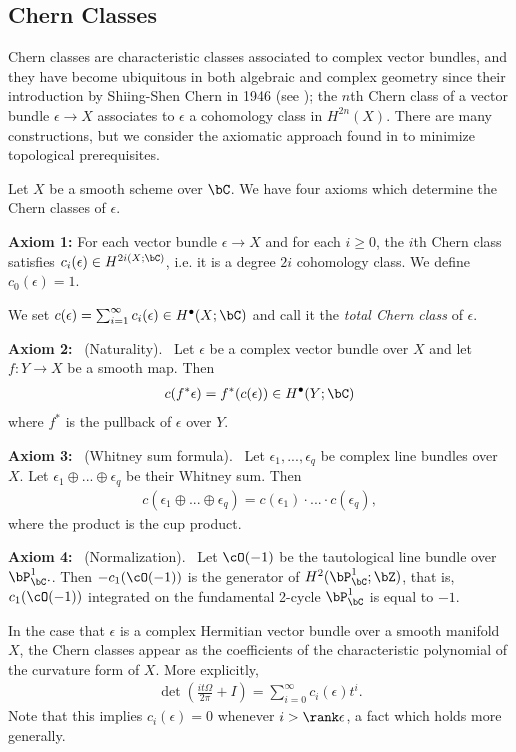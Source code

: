 \documentclass[raggedright, nofonts, notitlepage, openany, debug]{tufte-book}
\begin{document}
\subsection{Chern Classes}
Chern classes are characteristic classes associated to complex vector bundles, and they have become ubiquitous in both algebraic and complex geometry since their introduction by Shiing-Shen Chern in 1946 (see \cite{chern-class-first-paper}); the $n$th Chern class of a vector bundle $\epsilon \to X$ associates to $\epsilon$ a cohomology class in $H^{2n}(X)$. There are many constructions, but we consider the axiomatic approach found in \cite{complex-vector-bundles-book} to minimize topological prerequisites.

Let $X$ be a smooth scheme over $\bC$. We have four axioms which determine the Chern classes of $\epsilon$.

\textbf{Axiom 1:} For each vector bundle $\epsilon \to X$ and for each $i\geq 0$, the $i$th Chern class satisfies $c_i(\epsilon) \in H^{2i(X;\bC)}$, i.e. it is a degree $2i$ cohomology class. We define $c_0(\epsilon) = 1$.

\begin{rmk}
  We set $c(\epsilon) = \sum_{i=1}^\infty c_i(\epsilon) \in H^\bullet(X;\bC)$ and call it the \emph{total Chern class} of $\epsilon$.
\end{rmk}
\textbf{Axiom 2:} ~(Naturality).~ Let $\epsilon$ be a complex vector bundle over $X$ and let $f:Y\to X$ be a smooth map. Then
\begin{align*}
  c(f^*\epsilon) = f^*(c(\epsilon)) \in H^\bullet(Y;\bC)
\end{align*}
where $f^*$ is the pullback of $\epsilon$ over $Y$.

\textbf{Axiom 3:} ~(Whitney sum formula).~ Let $\epsilon_1,...,\epsilon_q$ be complex line bundles over $X$. Let $\epsilon_1\oplus ...\oplus \epsilon_q$ be their Whitney sum. Then
\begin{align*}
  c(\epsilon_1\oplus ...\oplus \epsilon_q) = c(\epsilon_1) \cdot ...\cdot c(\epsilon_q),
\end{align*}
where the product is the cup product.

\textbf{Axiom 4:} ~(Normalization).~ Let $\cO(-1)$ be the tautological line bundle over $\bP^1_{\bC}.$. Then $-c_1(\cO(-1))$ is the generator of $H^2(\bP_{\bC}^1;\bZ)$, that is, $c_1(\cO(-1))$ integrated on the fundamental 2-cycle $\bP^1_{\bC}$ is equal to $-1$.

\begin{rmk}
  In the case that $\epsilon$ is a complex Hermitian vector bundle over a smooth manifold $X$, the Chern classes appear as the coefficients of the characteristic polynomial of the curvature form of $X$. More explicitly,
  \begin{align*}
    \det\left(\frac{it\Omega}{2\pi} + I\right) = \sum_{i=0}^\infty c_i(\epsilon)t^i.
  \end{align*}
  Note that this implies $c_i(\epsilon) = 0$ whenever $i > \rank \epsilon$, a fact which holds more generally.
\end{rmk}
\end{document}
